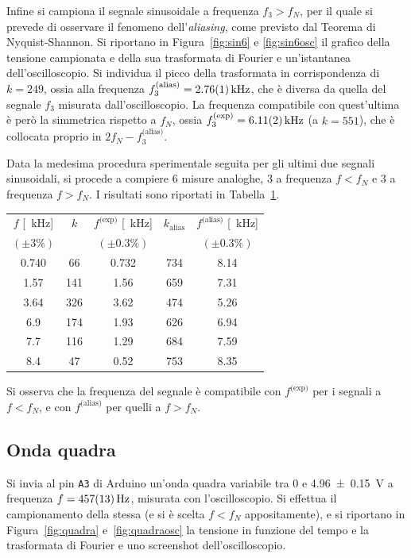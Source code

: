 \documentclass[10pt,oneside,a4paper]{article}
\begin{document}
\begin{multicols}{2}
Infine si campiona il segnale sinusoidale a frequenza $f_3 > f_N$, per il quale si prevede di osservare il fenomeno dell'\emph{aliasing}, come previsto dal Teorema di Nyquist-Shannon. Si riportano in Figura~\ref{fig:sin6} e \ref{fig:sin6osc} il grafico della tensione campionata e della sua trasformata di Fourier e un'istantanea dell'oscilloscopio. Si individua il picco della trasformata in corrispondenza di $k = 249$, ossia alla frequenza $f_3^\text{(alias)} = \SI{2.76 \pm 0.01}{\kilo\Hz}$, che è diversa da quella del segnale $f_3$ misurata dall'oscilloscopio. La frequenza compatibile con quest'ultima è però la simmetrica rispetto a $f_N$, ossia $f_3^\text{(exp)} = \SI{6.11 \pm 0.02}{\kilo\Hz}$ (a $k=551$), che è collocata proprio in $2f_N-f_3^\text{(alias)}$.



Data la medesima procedura sperimentale seguita per gli ultimi due segnali sinusoidali, si procede a compiere $6$ misure analoghe, $3$ a frequenza $f<f_N$ e $3$ a frequenza $f>f_N$. I risultati sono riportati in Tabella~\ref{tab:misure_sin}.

\begin{table}
\label{tab:misure_sin}
\centering
\begin{tabular}{c|c|c|c|c}
$f$ [\SI{}{\kilo\Hz}] & $k$ & $f^\text{(exp)}$ [\SI{}{\kilo\Hz}] & $k_\text{alias}$ & $f^\text{(alias)}$ [\SI{}{\kilo\Hz}] \\
$(\pm 3\%)$ & & $(\pm 0.3\%)$ &  & $(\pm 0.3\%)$  \\ 
\hline
0.740 &			66  & 0.732	 & 	734 & 8.14 	\\
1.57 & 			141 & 1.56   & 659	& 7.31 \\
3.64 & 			326 & 3.62	 & 474 	& 5.26  \\  
6.9  &			174 & 1.93	 & 626  & 6.94 \\
7.7  & 			116 & 1.29	 & 684  & 7.59 \\
8.4  &			47  & 0.52	 & 753  & 8.35 \\			 
\hline
\end{tabular}
\end{table}

Si osserva che la frequenza del segnale è compatibile con $f^\text{(exp)}$ per i segnali a $f<f_N$, e con $f^\text{(alias)}$ per quelli a $f>f_N$.

\subsection{Onda quadra}
Si invia al pin \texttt{A3} di Arduino un'onda quadra variabile tra $0$ e \SI{4.96 \pm 0.15}{V} a frequenza $f = \SI{457 \pm 13}{\Hz}$, misurata con l'oscilloscopio. Si effettua il campionamento della stessa (e si è scelta $f<f_N$ appositamente), e si riportano in Figura~\ref{fig:quadra} e~\ref{fig:quadraosc} la tensione in funzione del tempo e la trasformata di Fourier e uno screenshot dell'oscilloscopio. 


\end{multicols}
\end{document}
